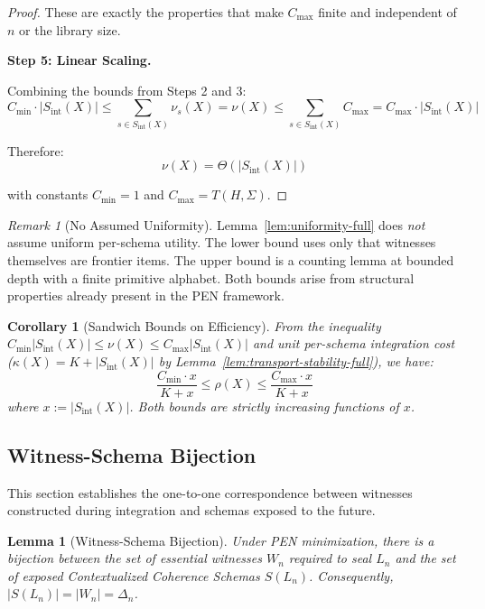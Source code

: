 \documentclass[11pt]{article}
\newtheorem{lemma}[theorem]{Lemma}
\newtheorem{corollary}[theorem]{Corollary}
\theoremstyle{definition}
\theoremstyle{remark}
\newtheorem{remark}[theorem]{Remark}
\begin{document}
\begin{proof}
These are exactly the properties that make $C_{\max}$ finite and independent of $n$ or the library size.

\textbf{Step 5: Linear Scaling.}

Combining the bounds from Steps 2 and 3:
\[
C_{\min} \cdot |S_{\text{int}}(X)| \leq \sum_{s \in S_{\text{int}}(X)} \nu_s(X) = \nu(X) \leq \sum_{s \in S_{\text{int}}(X)} C_{\max} = C_{\max} \cdot |S_{\text{int}}(X)|
\]

Therefore:
\[
\nu(X) = \Theta(|S_{\text{int}}(X)|)
\]

with constants $C_{\min} = 1$ and $C_{\max} = T(H,\Sigma)$.
\end{proof}

\begin{remark}[No Assumed Uniformity]
Lemma~\ref{lem:uniformity-full} does \emph{not} assume uniform per-schema utility. The lower bound
uses only that witnesses themselves are frontier items. The upper bound is a counting lemma at
bounded depth with a finite primitive alphabet. Both bounds arise from structural properties already
present in the PEN framework.
\end{remark}

\begin{corollary}[Sandwich Bounds on Efficiency]
\label{cor:sandwich-bounds}
From the inequality $C_{\min}|S_{\text{int}}(X)| \leq \nu(X) \leq C_{\max}|S_{\text{int}}(X)|$ and unit per-schema integration
cost ($\kappa(X) = K + |S_{\text{int}}(X)|$ by Lemma~\ref{lem:transport-stability-full}), we have:
\[
\frac{C_{\min} \cdot x}{K + x} \leq \rho(X) \leq \frac{C_{\max} \cdot x}{K + x}
\]
where $x := |S_{\text{int}}(X)|$. Both bounds are strictly increasing functions of $x$.
\end{corollary}

\subsection{Witness-Schema Bijection}
\label{app:bijection}

This section establishes the one-to-one correspondence between witnesses constructed during
integration and schemas exposed to the future.

\begin{lemma}[Witness-Schema Bijection]
\label{lem:witness-schema-bijection}
Under PEN minimization, there is a bijection between the set of essential witnesses $W_n$ required
to seal $L_n$ and the set of exposed Contextualized Coherence Schemas $S(L_n)$. Consequently,
$|S(L_n)| = |W_n| = \Delta_n$.
\end{lemma}
\end{document}
